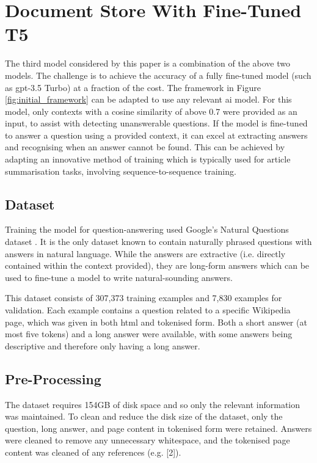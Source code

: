 \section{Document Store With Fine-Tuned T5}\label{sec:methodology_t5}
The third model considered by this paper is a combination of the above two models. The challenge is to achieve the accuracy of a fully fine-tuned model (such as \acrshort{gpt}-3.5 Turbo) at a fraction of the cost. The framework in Figure \ref{fig:initial_framework} can be adapted to use any relevant \acrshort{ai} model. For this model, only contexts with a cosine similarity of above 0.7 were provided as an input, to assist with detecting unanswerable questions. If the model is fine-tuned to answer a question using a provided context, it can excel at extracting answers and recognising when an answer cannot be found. This can be achieved by adapting an innovative method of training which is typically used for article summarisation tasks, involving sequence-to-sequence training. 

\subsection{Dataset}
Training the model for question-answering used Google's Natural Questions dataset \citep{NQdataset}. It is the only dataset known to contain naturally phrased questions with answers in natural language. While the answers are extractive (i.e. directly contained within the context provided), they are long-form answers which can be used to fine-tune a model to write natural-sounding answers.

This dataset consists of 307,373 training examples and 7,830 examples for validation. Each example contains a question related to a specific Wikipedia page, which was given in both \acrshort{html} and tokenised form. Both a short answer (at most five tokens) and a long answer were available, with some answers being descriptive and therefore only having a long answer.

\subsection{Pre-Processing}
The dataset requires 154GB of disk space and so only the relevant information was maintained. To clean and reduce the disk size of the dataset, only the question, long answer, and page content in tokenised form were retained. Answers were cleaned to remove any unnecessary whitespace, and the tokenised page content was cleaned of any references (e.g. [2]).

